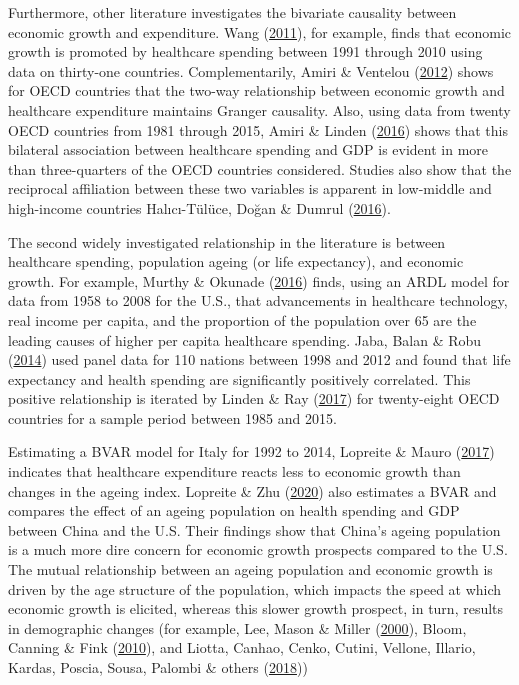 \documentclass[11pt,preprint, authoryear]{elsarticle}
\numberwithin{equation}{section}
\numberwithin{figure}{section}
\numberwithin{table}{section}
\begin{document}
Furthermore, other literature investigates the bivariate causality
between economic growth and expenditure. Wang
(\protect\hyperlink{ref-wang2011}{2011}), for example, finds that
economic growth is promoted by healthcare spending between 1991 through
2010 using data on thirty-one countries. Complementarily, Amiri \&
Ventelou (\protect\hyperlink{ref-amiri2012}{2012}) shows for OECD
countries that the two-way relationship between economic growth and
healthcare expenditure maintains Granger causality. Also, using data
from twenty OECD countries from 1981 through 2015, Amiri \& Linden
(\protect\hyperlink{ref-amiri2016}{2016}) shows that this bilateral
association between healthcare spending and GDP is evident in more than
three-quarters of the OECD countries considered. Studies also show that
the reciprocal affiliation between these two variables is apparent in
low-middle and high-income countries Halıcı-Tülüce, Doğan \& Dumrul
(\protect\hyperlink{ref-halici2016}{2016}).

The second widely investigated relationship in the literature is between
healthcare spending, population ageing (or life expectancy), and
economic growth. For example, Murthy \& Okunade
(\protect\hyperlink{ref-murthy2016}{2016}) finds, using an ARDL model
for data from 1958 to 2008 for the U.S., that advancements in healthcare
technology, real income per capita, and the proportion of the population
over 65 are the leading causes of higher per capita healthcare spending.
Jaba, Balan \& Robu (\protect\hyperlink{ref-jaba2014}{2014}) used panel
data for 110 nations between 1998 and 2012 and found that life
expectancy and health spending are significantly positively correlated.
This positive relationship is iterated by Linden \& Ray
(\protect\hyperlink{ref-linden2017}{2017}) for twenty-eight OECD
countries for a sample period between 1985 and 2015.

Estimating a BVAR model for Italy for 1992 to 2014, Lopreite \& Mauro
(\protect\hyperlink{ref-lopreite2017}{2017}) indicates that healthcare
expenditure reacts less to economic growth than changes in the ageing
index. Lopreite \& Zhu (\protect\hyperlink{ref-lopreite2020}{2020}) also
estimates a BVAR and compares the effect of an ageing population on
health spending and GDP between China and the U.S. Their findings show
that China's ageing population is a much more dire concern for economic
growth prospects compared to the U.S. The mutual relationship between an
ageing population and economic growth is driven by the age structure of
the population, which impacts the speed at which economic growth is
elicited, whereas this slower growth prospect, in turn, results in
demographic changes (for example, Lee, Mason \& Miller
(\protect\hyperlink{ref-lee2000}{2000}), Bloom, Canning \& Fink
(\protect\hyperlink{ref-bloom2010}{2010}), and Liotta, Canhao, Cenko,
Cutini, Vellone, Illario, Kardas, Poscia, Sousa, Palombi \& others
(\protect\hyperlink{ref-liotta2018}{2018}))
\end{document}
